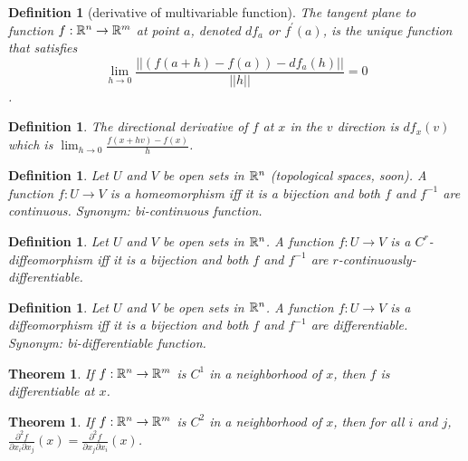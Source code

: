 \documentclass[11pt]{amsbook}
\theoremstyle{mystyle} \newtheorem{thrm}[thm]{Theorem}
\theoremstyle{mystyle} \newtheorem{defi}[thm]{Definition}
\theoremstyle{mystyle} \newtheorem{coro}[thm]{Corollary}
\theoremstyle{mystyle} \newtheorem{propo}[thm]{Proposition}
\theoremstyle{mystyle} \newtheorem{lemm}[thm]{Lemma}
\numberwithin{thm}{section}
\newcommand{\de}{\emph}
\begin{document}
\begin{defi}[derivative of multivariable function]
	The \de{tangent plane} to function $f : {\mathbb R}^n \to {\mathbb R}^m$ at point $a$, denoted $df_a$ or $f^{\prime}(a)$, is the unique function that satisfies $$\lim_{h\to 0} \frac{||\left(f(a+h) - f(a)\right) - df_a(h)||}{||h||} = 0$$.
\end{defi}
\begin{defi}
	The \de{directional derivative} of $f$ at $x$ in the $v$ direction is $df_x(v)$ which is $\lim_{h\to 0} \frac{f(x+hv) - f(x)}{h}$.
\end{defi}
\begin{defi}
	Let $U$ and $V$ be open sets in ${\mathbb R}^n$ (topological spaces, soon).  A function $f:U\to V$ is a \de{homeomorphism} iff it is a bijection and both $f$ and $f^{-1}$ are continuous.
	Synonym: bi-continuous function.
\end{defi}
\begin{defi}
	Let $U$ and $V$ be open sets in ${\mathbb R}^n$.  A function $f:U\to V$ is a \de{$C^r$-diffeomorphism} iff it is a bijection and both $f$ and $f^{-1}$ are $r$-continuously-differentiable.
\end{defi}
\begin{defi}
	Let $U$ and $V$ be open sets in ${\mathbb R}^n$.  A function $f:U\to V$ is a \de{diffeomorphism} iff it is a bijection and both $f$ and $f^{-1}$ are differentiable.
	Synonym: bi-differentiable function.
\end{defi}
\begin{thrm}
	If $f:{\mathbb R}^n \to {\mathbb R}^m$ is $C^1$ in a neighborhood of $x$, then $f$ is differentiable at $x$.
\end{thrm}
\begin{thrm}
	If $f:{\mathbb R}^n \to {\mathbb R}^m$ is $C^2$ in a neighborhood of $x$, then for all $i$ and $j$, $\frac{\partial^2f}{\partial x_i \partial x_j}(x) = \frac{\partial^2f}{\partial x_j \partial x_i}(x)$.
\end{thrm}
\end{document}
